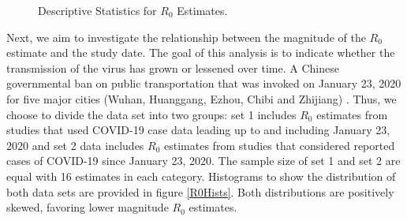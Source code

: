 \documentclass{article}
\begin{document}
\begin{figure}[!tbp]
  \centering
  \hfill
  \caption{Descriptive Statistics for $R_0$ Estimates.}
    \label{R0DescStats}
\end{figure}

Next, we aim to investigate the relationship between the magnitude of the $R_0$ estimate and the study date. The goal of this analysis is to indicate whether the transmission of the virus has grown or lessened over time. A Chinese governmental ban on public transportation that was invoked on January 23, 2020 for five major cities (Wuhan, Huanggang, Ezhou, Chibi and Zhijiang) \cite{2}. Thus, we choose to divide the data set into two groups: set 1 includes $R_0$ estimates from studies that used COVID-19 case data leading up to and including January 23, 2020 and set 2 data includes $R_0$ estimates from studies that considered reported cases of COVID-19 since January 23, 2020. The sample size of set 1 and set 2 are equal with 16 estimates in each category. Histograms to show the distribution of both data sets are provided in figure \ref{R0Hists}. Both distributions are positively skewed, favoring lower magnitude $R_0$ estimates.
\end{document}
